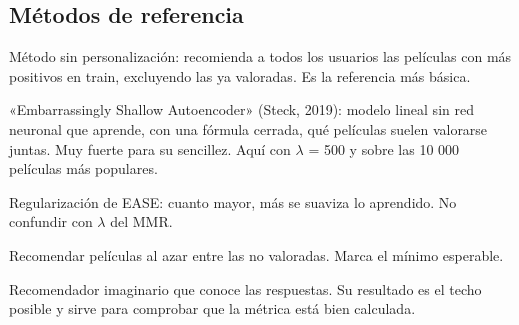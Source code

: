 \subsection*{Métodos de referencia}
\begin{description}\setlength{\itemsep}{2pt}
\item[Popularidad] Método sin personalización: recomienda a todos los usuarios las películas con más positivos en train, excluyendo las ya valoradas. Es la referencia más básica.
\item[EASE] «Embarrassingly Shallow Autoencoder» (Steck, 2019): modelo lineal sin red neuronal que aprende, con una fórmula cerrada, qué películas suelen valorarse juntas. Muy fuerte para su sencillez. Aquí con $\lambda$ = 500 y sobre las 10 000 películas más populares.
\item[$\lambda$ de EASE] Regularización de EASE: cuanto mayor, más se suaviza lo aprendido. No confundir con $\lambda$ del MMR.
\item[Azar] Recomendar películas al azar entre las no valoradas. Marca el mínimo esperable.
\item[Oráculo] Recomendador imaginario que conoce las respuestas. Su resultado es el techo posible y sirve para comprobar que la métrica está bien calculada.
\end{description}

